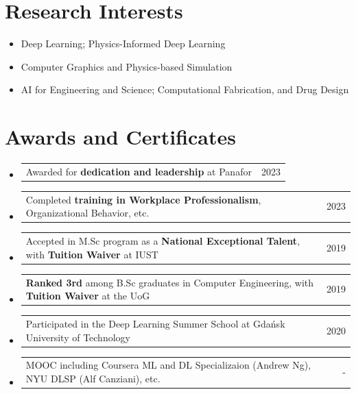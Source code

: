 \documentclass[letterpaper,11pt]{article}
\makeatletter
\newcommand{\resumeItem}[1]{
  \item\small{
    {#1 \vspace{0pt}}
  }
}
\newcommand{\awarditem}[2]{
  \item
    \begin{tabular*}{0.97\textwidth}{l@{\extracolsep{\fill}}r}
      #1 & #2 \\ 
    \end{tabular*}\vspace{-5pt}
}
\newcommand{\resumeSubHeadingListStart}{\begin{itemize}[leftmargin=*]}
\newcommand{\resumeSubHeadingListEnd}{\end{itemize}}
\newcommand{\awarditemListStart}{\begin{itemize}[leftmargin=*]}
\newcommand{\awarditemListEnd}{\end{itemize}\vspace{-5pt}}
\makeatother
\begin{document}

\section{Research Interests}
  \resumeSubHeadingListStart
    \resumeItem{Deep Learning; Physics-Informed Deep Learning}
    \vspace{-5pt}
    \resumeItem{Computer Graphics and Physics-based Simulation} 
    \vspace{-5pt}
    \resumeItem{AI for Engineering and Science; Computational Fabrication, and Drug Design}
  \resumeSubHeadingListEnd

\section{Awards and Certificates}
\awarditemListStart
  \awarditem{Awarded for \textbf{dedication and leadership} at Panafor}{2023}
  \awarditem{Completed \textbf{training in Workplace Professionalism}, Organizational Behavior, etc.}{2023}
  \awarditem{Accepted in M.Sc program as a \textbf{National Exceptional Talent}, with \textbf{Tuition Waiver} at IUST}{2019}
  \awarditem{\textbf{Ranked 3rd} among B.Sc graduates in Computer Engineering, with \textbf{Tuition Waiver} at the UoG}{2019}
  \awarditem{Participated in the Deep Learning Summer School at Gda\'{n}sk University of Technology}{2020}
  \awarditem{MOOC including Coursera ML and DL Specializaion (Andrew Ng), NYU DLSP (Alf Canziani), etc.}{-}

\awarditemListEnd
\end{document}
